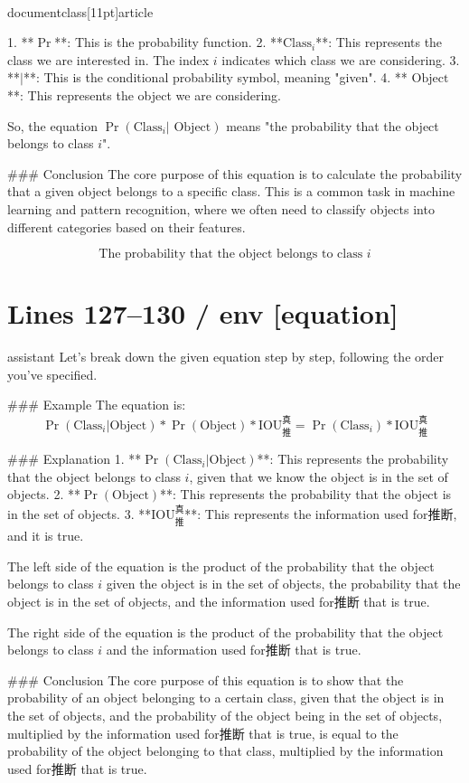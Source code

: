 \\documentclass[11pt]{article}
\begin{document}
1. **\(\Pr\)**: This is the probability function.
2. **\(\textrm{Class}_i\)**: This represents the class we are interested in. The index \(i\) indicates which class we are considering.
3. **\(|\)**: This is the conditional probability symbol, meaning "given".
4. **\(\textrm{ Object}\)**: This represents the object we are considering.

So, the equation \(\Pr(\textrm{Class}_i | \textrm{ Object})\) means "the probability that the object belongs to class \(i\)".

### Conclusion
The core purpose of this equation is to calculate the probability that a given object belongs to a specific class. This is a common task in machine learning and pattern recognition, where we often need to classify objects into different categories based on their features.

\[
\boxed{\text{The probability that the object belongs to class } i}
\]

\section*{Lines 127–130 / env [equation]}
assistant
Let's break down the given equation step by step, following the order you've specified.

### Example
The equation is:
\[
\Pr(\textrm{Class}_i | \textrm{Object}) * \Pr(\textrm{Object}) * \textrm{IOU}_{\textrm{推}}^{\textrm{真}} = \Pr(\textrm{Class}_i) * \textrm{IOU}_{\textrm{推}}^{\textrm{真}}
\]

### Explanation
1. **\(\Pr(\textrm{Class}_i | \textrm{Object})\)**: This represents the probability that the object belongs to class \(i\), given that we know the object is in the set of objects.
2. **\(\Pr(\textrm{Object})\)**: This represents the probability that the object is in the set of objects.
3. **\(\textrm{IOU}_{\textrm{推}}^{\textrm{真}}\)**: This represents the information used for推断, and it is true.

The left side of the equation is the product of the probability that the object belongs to class \(i\) given the object is in the set of objects, the probability that the object is in the set of objects, and the information used for推断 that is true.

The right side of the equation is the product of the probability that the object belongs to class \(i\) and the information used for推断 that is true.

### Conclusion
The core purpose of this equation is to show that the probability of an object belonging to a certain class, given that the object is in the set of objects, and the probability of the object being in the set of objects, multiplied by the information used for推断 that is true, is equal to the probability of the object belonging to that class, multiplied by the information used for推断 that is true.
\end{document}
